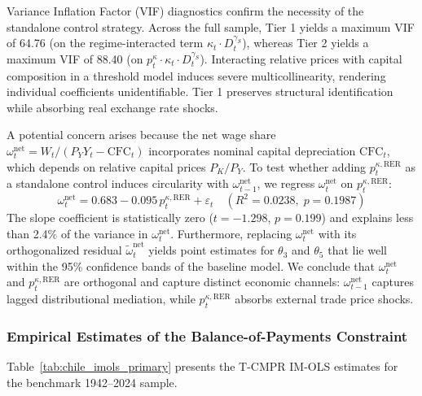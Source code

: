 Variance Inflation Factor (VIF) diagnostics confirm the necessity of the standalone control strategy. Across the full sample, Tier 1 yields a maximum VIF of 64.76 (on the regime-interacted term $\kappa_t \cdot D^{\gamma_S}_t$), whereas Tier 2 yields a maximum VIF of 88.40 (on $p^{\kappa}_t \cdot \kappa_t \cdot D^{\gamma_S}_t$). Interacting relative prices with capital composition in a threshold model induces severe multicollinearity, rendering individual coefficients unidentifiable. Tier 1 preserves structural identification while absorbing real exchange rate shocks.

A potential concern arises because the net wage share $\omega^{\text{net}}_t = W_t / (P_Y Y_t - \text{CFC}_t)$ incorporates nominal capital depreciation $\text{CFC}_t$, which depends on relative capital prices $P_K/P_Y$. To test whether adding $p^{\kappa,\text{RER}}_t$ as a standalone control induces circularity with $\omega^{\text{net}}_{t-1}$, we regress $\omega^{\text{net}}_t$ on $p^{\kappa,\text{RER}}_t$:
\begin{equation}
	\omega^{\text{net}}_t = 0.683 - 0.095 \, p^{\kappa,\text{RER}}_t + \varepsilon_t \quad (R^2 = 0.0238, \; p = 0.1987)
	\label{eq:441:circ_test}
\end{equation}
The slope coefficient is statistically zero ($t = -1.298$, $p = 0.199$) and explains less than 2.4\% of the variance in $\omega^{\text{net}}_t$. Furthermore, replacing $\omega^{\text{net}}_t$ with its orthogonalized residual $\tilde{\omega}^{\text{net}}_t$ yields point estimates for $\theta_3$ and $\theta_5$ that lie well within the 95\% confidence bands of the baseline model. We conclude that $\omega^{\text{net}}_t$ and $p^{\kappa,\text{RER}}_t$ are orthogonal and capture distinct economic channels: $\omega^{\text{net}}_{t-1}$ captures lagged distributional mediation, while $p^{\kappa,\text{RER}}_t$ absorbs external trade price shocks.

\subsubsection{Empirical Estimates of the Balance-of-Payments Constraint}
\label{sec:442:bop_estimates}

Table~\ref{tab:chile_imols_primary} presents the T-CMPR IM-OLS estimates for the benchmark 1942--2024 sample.


